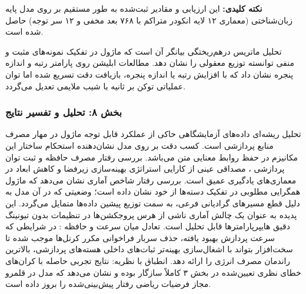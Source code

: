 \textbf{نکته کلیدی:} این ارزیابی و مقادیر ثبت‌شده به طور مستقیم بر روی مدل پایه زبان‌شناختی  (معماری ۱۲ لایه انکودر متراکم با ۷۶۸ بعد مخفی و ۱۲ سر توجه) حاصل شده است.

تحلیل ماتریس درهم‌ریختگی  بیانگر آن است که ماژول در تفکیک نمونه‌های مثبت و منفی توانسته توزیع معقولی را نشان دهد. مطالعات ابلیشن  روی پارامتر رتبه و اندازه پنجره نشان داد که با افزایش رتبه یا اندازه پنجره، بازیافت دقت تسریع شده اما توان عملیاتی توکن بر ثانیه با شیب ملایمی تعدیل می‌گردد.
\subsubsection*{بخش ۸: تحلیل و تفسیر نتایج }
تحلیل ریشه‌ای داده‌های آزمایشگاهی حاکی از عملکرد قابل توجه ماژول  در مهار مصرف منابع پردازشی است. کسب دقت  بر روی مدل  نشان‌دهنده استحکام ساختار این مکانیزم در حفظ روابط معنایی متن می‌باشد.
بررسی رفتار مصرف حافظه و ثبت توان پردازشی  ، مصداقی عینی از کارایی استراتژی بهینه‌سازی زیرفضا و کاهش ابعاد در معماری‌های یادگیری عمیق است.
بررسی رفتار شاخص آماری  نشان می‌دهد که ماژول همگرایی مطلوبی در تفکیک دسته‌ها از خود نشان داده است؛ وضعیتی که در آن مدل به دلیل قطع مسیرهای گرادیانی فرعی، به سمت توزیع پیشین داده‌ها متمایل می‌گردد. این پدیده به عنوان یک چالش آماری ناشی از هرس پروجکشن‌ها در تنظیمات بدون تیونینگ دقیق هایپرپارامترها قابل تحلیل است.
تعادل میان سرعت و حافظه : در شرایطی که سرعت پردازش بهبود یافته، حذف سربار فراخوانی مکرر کرنل‌ها موجب شده تا سخت‌افزار بتواند با اشغال‌سازی بهینه‌تر ثبات‌های داخلی هسته‌های پردازشی، بالاترین راندمان مصرف انرژی را ارائه دهد.
انطباق با نظریه: نتایج تجربی حاصله با کران‌های خطای نظری تعیین‌شده در بخش ۳ کاملاً سازگار بوده و نشان می‌دهد که مدل در قلمرو مجاز فرضیات ریاضی رفتار پیش‌بینی‌شده را بروز داده است.

